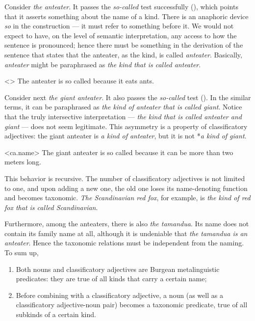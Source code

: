 \documentclass[a4paper, 12pt]{article}
\begin{document}
Consider \textit{the anteater}. It passes the \textit{so-called} test successfully (\nextx), which points that it asserts something about the name of a kind. There is an anaphoric device \textit{so} in the construction --- it must refer to something before it. We would not expect to have, on the level of semantic interpretation, any access to how the sentence is pronounced; hence there must be something in the derivation of the sentence that states that the anteater, as the kind, is called \textit{anteater}. Basically, \textit{anteater} might be paraphrased as \textit{the kind that is called anteater}.

\ex<>
    The anteater is so called because it eats ants.
\xe

Consider next \textit{the giant anteater}. It also passes the \textit{so-called} test (\nextx). In the similar terms, it can be paraphrased as \textit{the kind of anteater that is called giant}. Notice that the truly intersective interpretation --- \textit{the kind that is called anteater and giant} --- does not seem legitimate. This asymmetry is a property of classificatory adjectives: the giant anteater is \textit{a kind of anteater}, but it is not *\textit{a kind of giant}.

\pex<ca.name>
    \a The giant anteater is so called because it can be more than two meters long.
\xe

This behavior is recursive. The number of classificatory adjectives is not limited to one, and upon adding a new one, the old one loses its name-denoting function and becomes taxonomic. \textit{The Scandinavian red fox}, for example, is \textit{the kind of red fox that is called Scandinavian}.

Furthermore, among the anteaters, there is also \textit{the tamandua}. Its name does not contain its family name at all, although it is undeniable that \textit{the tamandua is an anteater}. Hence the taxonomic relations must be independent from the naming. To sum up,

\begin{enumerate}
    \item Both nouns and classificatory adjectives are Burgean metalinguistic predicates: they are true of all kinds that carry a certain name;
    \item Before combining with a classificatory adjective, a noun (as well as a classificatory adjective-noun pair) becomes a taxonomic predicate, true of all subkinds of a certain kind.
\end{enumerate}
\end{document}

